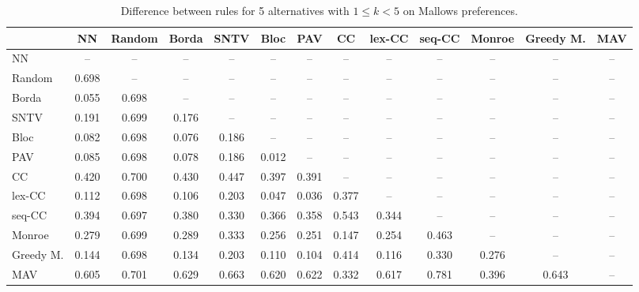 
\begin{table*}[htbp]
\centering
\begin{tabular}{lcccccccccccc}
\toprule
 & NN & Random & Borda & SNTV & Bloc & PAV & CC & lex-CC & seq-CC & Monroe & Greedy M. & MAV \\
\midrule
NN & -- & -- & -- & -- & -- & -- & -- & -- & -- & -- & -- & -- \\
Random & \cellcolor{blue!69} 0.698 & -- & -- & -- & -- & -- & -- & -- & -- & -- & -- & -- \\
Borda & \cellcolor{blue!5} 0.055 & \cellcolor{blue!69} 0.698 & -- & -- & -- & -- & -- & -- & -- & -- & -- & -- \\
SNTV & \cellcolor{blue!19} 0.191 & \cellcolor{blue!69} 0.699 & \cellcolor{blue!17} 0.176 & -- & -- & -- & -- & -- & -- & -- & -- & -- \\
Bloc & \cellcolor{blue!8} 0.082 & \cellcolor{blue!69} 0.698 & \cellcolor{blue!7} 0.076 & \cellcolor{blue!18} 0.186 & -- & -- & -- & -- & -- & -- & -- & -- \\
PAV & \cellcolor{blue!8} 0.085 & \cellcolor{blue!69} 0.698 & \cellcolor{blue!7} 0.078 & \cellcolor{blue!18} 0.186 & \cellcolor{blue!1} 0.012 & -- & -- & -- & -- & -- & -- & -- \\
CC & \cellcolor{blue!42} 0.420 & \cellcolor{blue!70} 0.700 & \cellcolor{blue!43} 0.430 & \cellcolor{blue!44} 0.447 & \cellcolor{blue!39} 0.397 & \cellcolor{blue!39} 0.391 & -- & -- & -- & -- & -- & -- \\
lex-CC & \cellcolor{blue!11} 0.112 & \cellcolor{blue!69} 0.698 & \cellcolor{blue!10} 0.106 & \cellcolor{blue!20} 0.203 & \cellcolor{blue!4} 0.047 & \cellcolor{blue!3} 0.036 & \cellcolor{blue!37} 0.377 & -- & -- & -- & -- & -- \\
seq-CC & \cellcolor{blue!39} 0.394 & \cellcolor{blue!69} 0.697 & \cellcolor{blue!38} 0.380 & \cellcolor{blue!33} 0.330 & \cellcolor{blue!36} 0.366 & \cellcolor{blue!35} 0.358 & \cellcolor{blue!54} 0.543 & \cellcolor{blue!34} 0.344 & -- & -- & -- & -- \\
Monroe & \cellcolor{blue!27} 0.279 & \cellcolor{blue!69} 0.699 & \cellcolor{blue!28} 0.289 & \cellcolor{blue!33} 0.333 & \cellcolor{blue!25} 0.256 & \cellcolor{blue!25} 0.251 & \cellcolor{blue!14} 0.147 & \cellcolor{blue!25} 0.254 & \cellcolor{blue!46} 0.463 & -- & -- & -- \\
Greedy M. & \cellcolor{blue!14} 0.144 & \cellcolor{blue!69} 0.698 & \cellcolor{blue!13} 0.134 & \cellcolor{blue!20} 0.203 & \cellcolor{blue!11} 0.110 & \cellcolor{blue!10} 0.104 & \cellcolor{blue!41} 0.414 & \cellcolor{blue!11} 0.116 & \cellcolor{blue!33} 0.330 & \cellcolor{blue!27} 0.276 & -- & -- \\
MAV & \cellcolor{blue!60} 0.605 & \cellcolor{blue!70} 0.701 & \cellcolor{blue!62} 0.629 & \cellcolor{blue!66} 0.663 & \cellcolor{blue!62} 0.620 & \cellcolor{blue!62} 0.622 & \cellcolor{blue!33} 0.332 & \cellcolor{blue!61} 0.617 & \cellcolor{blue!78} 0.781 & \cellcolor{blue!39} 0.396 & \cellcolor{blue!64} 0.643 & -- \\
\bottomrule
\end{tabular}

\caption{Difference between rules for 5 alternatives with $1 \leq k < 5$ on Mallows preferences.}
\label{tab:rule_distance_heatmap-m=[5]-pref_dist=MALLOWS-RELPHI-R}
\end{table*}
    